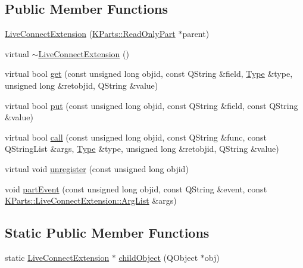 \subsection*{Public Member Functions}
\begin{DoxyCompactItemize}
\item 
\hyperlink{classKParts_1_1LiveConnectExtension_a11b7499199001f613246861dda90c101}{Live\+Connect\+Extension} (\hyperlink{classKParts_1_1ReadOnlyPart}{K\+Parts\+::\+Read\+Only\+Part} $\ast$parent)
\item 
virtual \hyperlink{classKParts_1_1LiveConnectExtension_aef598b47d0fc11d1323588c67928da7c}{$\sim$\+Live\+Connect\+Extension} ()
\item 
virtual bool \hyperlink{classKParts_1_1LiveConnectExtension_a91ddec0deaa49516ade1e86d8bbd3b90}{get} (const unsigned long objid, const Q\+String \&field, \hyperlink{classKParts_1_1LiveConnectExtension_a8dfff0d5feb20316c714179c9eda9a9c}{Type} \&type, unsigned long \&retobjid, Q\+String \&value)
\item 
virtual bool \hyperlink{classKParts_1_1LiveConnectExtension_a20088d732c9bf45abf31e9723b263e4f}{put} (const unsigned long objid, const Q\+String \&field, const Q\+String \&value)
\item 
virtual bool \hyperlink{classKParts_1_1LiveConnectExtension_ac925e087aa86e8e11c7616b8f03551a0}{call} (const unsigned long objid, const Q\+String \&func, const Q\+String\+List \&args, \hyperlink{classKParts_1_1LiveConnectExtension_a8dfff0d5feb20316c714179c9eda9a9c}{Type} \&type, unsigned long \&retobjid, Q\+String \&value)
\item 
virtual void \hyperlink{classKParts_1_1LiveConnectExtension_aceb4e2b994572baf1d87f78c7134c42a}{unregister} (const unsigned long objid)
\item 
void \hyperlink{classKParts_1_1LiveConnectExtension_a0cb4efb5b26992f31ae44f3d4a6ba2a1}{part\+Event} (const unsigned long objid, const Q\+String \&event, const \hyperlink{classKParts_1_1LiveConnectExtension_a16a7a582605755e47eaab5b37e73d8cb}{K\+Parts\+::\+Live\+Connect\+Extension\+::\+Arg\+List} \&args)
\end{DoxyCompactItemize}
\subsection*{Static Public Member Functions}
\begin{DoxyCompactItemize}
\item 
static \hyperlink{classKParts_1_1LiveConnectExtension}{Live\+Connect\+Extension} $\ast$ \hyperlink{classKParts_1_1LiveConnectExtension_acfe5c3014688d5b0efdc5a1534aacb49}{child\+Object} (Q\+Object $\ast$obj)
\end{DoxyCompactItemize}


